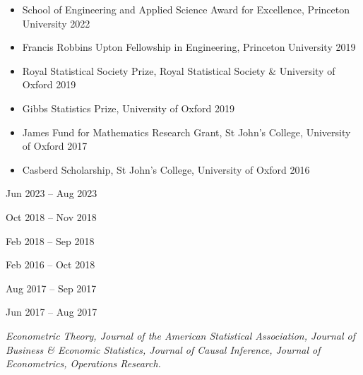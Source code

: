 \documentclass{wgu-cv}
\begin{document}
\begin{itemize}
  \item School of Engineering and Applied Science Award for Excellence,
    Princeton University
    \hfill 2022%
  \item Francis Robbins Upton Fellowship in Engineering,
    Princeton University
    \hfill 2019%
  \item Royal Statistical Society Prize,
    Royal Statistical Society \& University of Oxford
    \hfill 2019%
  \item Gibbs Statistics Prize,
    University of Oxford
    \hfill 2019%
  \item James Fund for Mathematics Research Grant,
    St John's College, University of Oxford
    \hfill 2017%
  \item Casberd Scholarship,
    St John's College, University of Oxford
    \hfill 2016%
\end{itemize}

\vspace*{1mm}


{Jun 2023 -- Aug 2023}
\vspace*{1mm}

{Oct 2018 -- Nov 2018}
\vspace*{1mm}

{Feb 2018 -- Sep 2018}
\vspace*{1mm}

{Feb 2016 -- Oct 2018}
\vspace*{1mm}

{Aug 2017 -- Sep 2017}
\vspace*{1mm}

{Jun 2017 -- Aug 2017}
\vspace*{2mm}


\emph{Econometric Theory,
  Journal of the American Statistical Association,
  Journal of Business \& Economic Statistics,
  Journal of Causal Inference,
  Journal of Econometrics,
Operations Research.}
\end{document}
